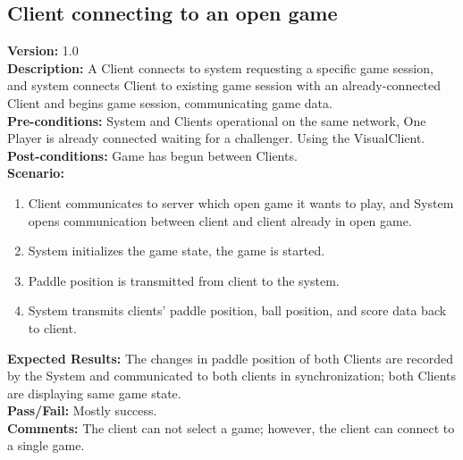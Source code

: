 \documentclass[12pt]{article}
\begin{document}
    \subsection{Client connecting to an open game}
    \label{sec:openGameConnect}
    \textbf{Version:} 1.0\\
    \textbf{Description:} A Client connects to system requesting a specific game session, and system connects Client to existing game session with an already-connected Client and begins game session, communicating game data.\\
    \textbf{Pre-conditions:} System and Clients operational on the same network, One Player is already connected waiting for a challenger.  Using the VisualClient.\\
    \textbf{Post-conditions:} Game has begun between Clients.\\
    \textbf{Scenario:}
    \begin{enumerate}
        \item Client communicates to server which open game it wants to play, and System opens communication between client and client already in open game.
        \item System initializes the game state, the game is started.
        \item Paddle position is transmitted from client to the system.
        \item System transmits clients’ paddle position, ball position, and score data back to client.
        \end{enumerate}
    \textbf{Expected Results:} The changes in paddle position of both Clients are recorded by the System and communicated to both clients in synchronization; both Clients are displaying same game state.\\
    \textbf{Pass/Fail:} Mostly success.\\
    \textbf{Comments:} The client can not select a game; however, the client can connect to a single game.\\
\end{document}
